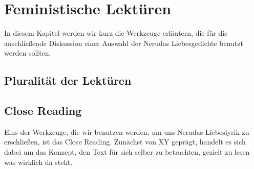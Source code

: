 \section{Feministische Lektüren}

In diesem Kapitel werden wir kurz die Werkzeuge erläutern, die für die anschließende Diskussion einer Auswahl der Nerudas Liebesgedichte benutzt werden sollten.

\subsection{Pluralität der Lektüren}

\begin{comment}
[Beehler1988]
"Consequently, what we teach in the English class-
room is not "literature" but ways of reading. By
helping students to identify different methods,
different positions from which to view a work, we
help them to realize that texts do not "reveal"
truth: they simply provide the field upon which
meanings can be produced."
\end{comment}

\subsection{Close Reading}

Eins der Werkzeuge, die wir benutzen werden, um uns Nerudas Liebeslyrik zu erschließen, ist das Close Reading.
Zunächst von XY geprägt, handelt es sich dabei um das Konzept, den Text für sich selber zu betrachten, gezielt zu lesen was wirklich da steht.


